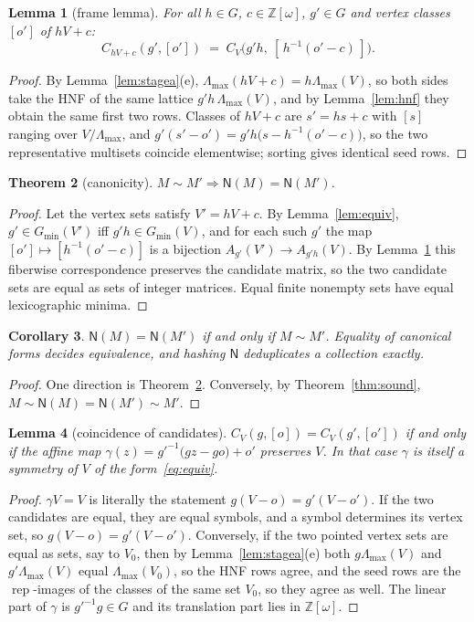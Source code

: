\documentclass[11pt]{article}
\newtheorem{theorem}{Theorem}[section]
\newtheorem{lemma}[theorem]{Lemma}
\newtheorem{corollary}[theorem]{Corollary}
\theoremstyle{definition}
\newcommand{\Zw}{\mathbb{Z}[\omega]}
\newcommand{\Lmax}{\Lambda_{\max}}
\newcommand{\Gmin}{G_{\min}}
\newcommand{\rep}{\operatorname{rep}}
\newcommand{\N}{\mathsf{N}}
\begin{document}
\begin{lemma}[frame lemma]\label{lem:frame}
For all $h\in G$, $c\in\Zw$, $g'\in G$ and vertex classes $[o']$ of $hV+c$:
\[
  C_{hV+c}(g',[o']) \;=\; C_V\bigl(g'h,\ [\,h^{-1}(o'-c)\,]\bigr).
\]
\end{lemma}

\begin{proof}
By Lemma~\ref{lem:stagea}(e), $\Lmax(hV+c)=h\Lmax(V)$, so both sides take the HNF of the
same lattice $g'h\,\Lmax(V)$, and by Lemma~\ref{lem:hnf} they obtain the same first two
rows. Classes of $hV+c$ are $s'=hs+c$ with $[s]$ ranging over $V/\Lmax$, and
$g'(s'-o')=g'h\bigl(s-h^{-1}(o'-c)\bigr)$, so the two representative multisets coincide
elementwise; sorting gives identical seed rows.
\end{proof}

\begin{theorem}[canonicity]\label{thm:canon}
$M\sim M'\Rightarrow \N(M)=\N(M')$.
\end{theorem}

\begin{proof}
Let the vertex sets satisfy $V'=hV+c$. By Lemma~\ref{lem:equiv},
$g'\in\Gmin(V')$ iff $g'h\in\Gmin(V)$, and for each such $g'$ the map
$[o']\mapsto[h^{-1}(o'-c)]$ is a bijection $A_{g'}(V')\to A_{g'h}(V)$. By
Lemma~\ref{lem:frame} this fiberwise correspondence preserves the candidate matrix, so the
two candidate sets are equal as sets of integer matrices. Equal finite nonempty sets have
equal lexicographic minima.
\end{proof}

\begin{corollary}\label{cor:iff}
$\N(M)=\N(M')$ if and only if $M\sim M'$. Equality of canonical forms decides equivalence,
and hashing $\N$ deduplicates a collection exactly.
\end{corollary}

\begin{proof}
One direction is Theorem~\ref{thm:canon}. Conversely, by Theorem~\ref{thm:sound},
$M\sim\N(M)=\N(M')\sim M'$.
\end{proof}

\begin{lemma}[coincidence of candidates]\label{lem:ties}
$C_V(g,[o])=C_V(g',[o'])$ if and only if the affine map
$\gamma(z)=g'^{-1}\bigl(gz-go\bigr)+o'$ preserves $V$. In that case $\gamma$ is itself a
symmetry of $V$ of the form~\eqref{eq:equiv}.
\end{lemma}

\begin{proof}
$\gamma V=V$ is literally the statement $g(V-o)=g'(V-o')$. If the two candidates are
equal, they are equal symbols, and a symbol determines its vertex set, so
$g(V-o)=g'(V-o')$. Conversely, if the two pointed vertex sets are equal as sets, say to
$V_0$, then by Lemma~\ref{lem:stagea}(e) both $g\Lmax(V)$ and $g'\Lmax(V)$ equal
$\Lmax(V_0)$, so the HNF rows agree, and the seed rows are the $\rep$-images of the classes
of the same set $V_0$, so they agree as well. The linear part of $\gamma$ is
$g'^{-1}g\in G$ and its translation part lies in $\Zw$.
\end{proof}
\end{document}
